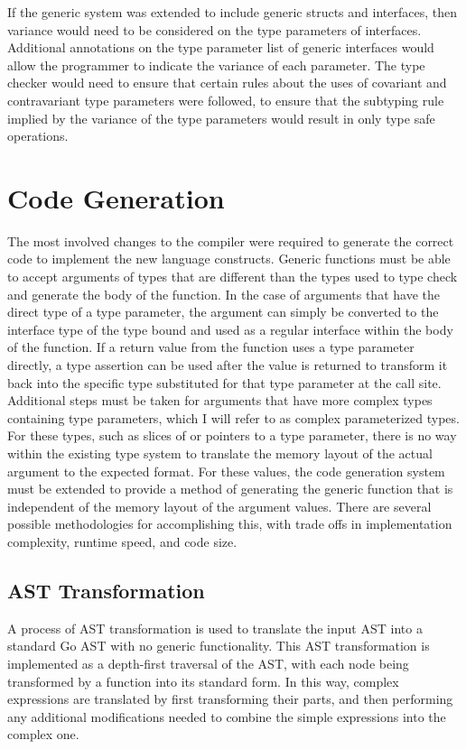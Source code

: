 \documentclass[letterpaper,twocolumn,11pt]{article}
\begin{document}
If the generic system was extended to include generic structs and interfaces, then variance would need to be considered on the type parameters of interfaces. Additional annotations on the type parameter list of generic interfaces would allow the programmer to indicate the variance of each parameter. The type checker would need to ensure that certain rules about the uses of covariant and contravariant type parameters were followed, to ensure that the subtyping rule implied by the variance of the type parameters would result in only type safe operations.

\section{Code Generation} \label{code_generation}

The most involved changes to the compiler were required to generate the correct code to implement the new language constructs. Generic functions must be able to accept arguments of types that are different than the types used to type check and generate the body of the function. In the case of arguments that have the direct type of a type parameter, the argument can simply be converted to the interface type of the type bound and used as a regular interface within the body of the function. If a return value from the function uses a type parameter directly, a type assertion can be used after the value is returned to transform it back into the specific type substituted for that type parameter at the call site. Additional steps must be taken for arguments that have more complex types containing type parameters, which I will refer to as complex parameterized types. For these types, such as slices of or pointers to a type parameter, there is no way within the existing type system to translate the memory layout of the actual argument to the expected format. For these values, the code generation system must be extended to provide a method of generating the generic function that is independent of the memory layout of the argument values. There are several possible methodologies for accomplishing this, with trade offs in implementation complexity, runtime speed, and code size. 

\subsection{AST Transformation} \label{ast_transformation}

A process of AST transformation is used to translate the input AST into a standard Go AST with no generic functionality. This AST transformation is implemented as a depth-first traversal of the AST, with each node being transformed by a function into its standard form. In this way, complex expressions are translated by first transforming their parts, and then performing any additional modifications needed to combine the simple expressions into the complex one.
\end{document}
